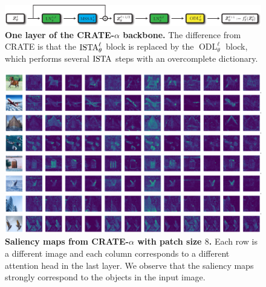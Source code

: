 \documentclass[../../book-main.tex]{subfiles}
\begin{document}
\begin{figure}
    \centering 
    \includegraphics[width=\textwidth]{chapters/chapter7/figs/crate_alpha_backbone.pdf}
    \caption{\small\textbf{One layer of the CRATE-\(\alpha\) backbone.} The difference from CRATE is that the \(\operatorname{ISTA}_{\theta}^{\ell}\) block is replaced by the \(\operatorname{ODL}_{\theta}^{\ell}\) block, which performs several \(\operatorname{ISTA}\) steps with an overcomplete dictionary.}
    \label{fig:crate_alpha_backbone}
\end{figure}

\begin{figure}
    \centering 
    \includegraphics[width=\textwidth]{chapters/chapter7/figs/crate_alpha_semantic_heads.pdf}
    \caption{\small\textbf{Saliency maps from CRATE-\(\alpha\) with patch size \(8\).} Each row is a different image and each column corresponds to a different attention head in the last layer. We observe that the saliency maps strongly correspond to the objects in the input image.}
    \label{fig:crate_alpha_saliency_maps}
\end{figure}
\end{document}
